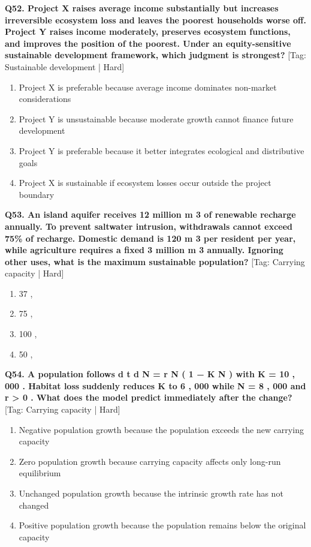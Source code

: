 \noindent\textbf{Q52. Project X raises average income substantially but increases irreversible ecosystem loss and leaves the poorest households worse off. Project Y raises income moderately, preserves ecosystem functions, and improves the position of the poorest. Under an equity-sensitive sustainable development framework, which judgment is strongest?} \hfill [Tag: Sustainable development | Hard]
\begin{enumerate}[label=(\alph*),topsep=2pt,itemsep=1pt,partopsep=0pt,parsep=0pt]
    \item {Project X is preferable because average income dominates non-market considerations}
    \item {Project Y is unsustainable because moderate growth cannot finance future development}
    \item {Project Y is preferable because it better integrates ecological and distributive goals}
    \item {Project X is sustainable if ecosystem losses occur outside the project boundary}
\end{enumerate}
\vspace{2mm}

\noindent\textbf{Q53. An island aquifer receives 12 million m 3 of renewable recharge annually. To prevent saltwater intrusion, withdrawals cannot exceed 75\% of recharge. Domestic demand is 120 m 3 per resident per year, while agriculture requires a fixed 3 million m 3 annually. Ignoring other uses, what is the maximum sustainable population?} \hfill [Tag: Carrying capacity | Hard]
\begin{enumerate}[label=(\alph*),topsep=2pt,itemsep=1pt,partopsep=0pt,parsep=0pt]
    \item {37 ,}
    \item {75 ,}
    \item {100 ,}
    \item {50 ,}
\end{enumerate}
\vspace{2mm}

\noindent\textbf{Q54. A population follows d t d N = r N ( 1 − K N ) with K = 10 , 000 . Habitat loss suddenly reduces K to 6 , 000 while N = 8 , 000 and r > 0 . What does the model predict immediately after the change?} \hfill [Tag: Carrying capacity | Hard]
\begin{enumerate}[label=(\alph*),topsep=2pt,itemsep=1pt,partopsep=0pt,parsep=0pt]
    \item {Negative population growth because the population exceeds the new carrying capacity}
    \item {Zero population growth because carrying capacity affects only long-run equilibrium}
    \item {Unchanged population growth because the intrinsic growth rate has not changed}
    \item {Positive population growth because the population remains below the original capacity}
\end{enumerate}
\vspace{2mm}

